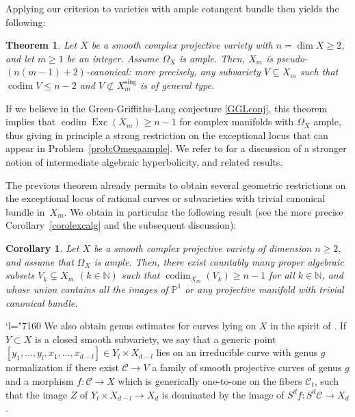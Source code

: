 \documentclass[JEP,XML,SOM,Unicode, NoEqCountersInSection,NoFloatCountersInSection,published]{cedram}
\let\mathcal\mathscr
\newcommand{\Changel}{\mathcode`l="7160}
\newcommand{\sing}{\mathrm{sing}}
\DeclareMathOperator{\codim}{codim}
\DeclareMathOperator{\Exc}{Exc}
\theoremstyle{theorem}
\newtheorem{theorem}{Theorem}
\newtheorem{corollary}[proposition]{Corollary}
\theoremstyle{definition}
\def\bP{{\mathbb P}}
\begin{document}
Applying our criterion to varieties with ample cotangent bundle then yields the following:

\begin{theorem} \label{thmsubv0}
Let $X$ be a smooth complex projective variety with $n=\dim X \geq 2$, and let \(m \geq 1\) be an integer. Assume $\Omega_X$ is ample. Then, \(X_{m}\) is pseudo-\((n(m-1) + 2)\)-canonical: more precisely, any subvariety $V \subseteq X_m$ such that $\codim  V \leq n - 2$ and $V \not\subset X_m^{\sing}$ is of general type.
\end{theorem}

If we believe in the Green-Griffiths-Lang conjecture \ref{GGLconj}, this theorem implies that $\codim\Exc(X_m) \geq n - 1$ for complex manifolds with $\Omega_X$ ample, thus giving in principle a strong restriction on the exceptional locus that can appear in Problem~\ref{prob:Omegaample}. We refer to \cite{EJR20} for a discussion of a stronger notion of intermediate algebraic hyperbolicity, and related results.

The previous theorem already permits to obtain several geometric restrictions on the exceptional locus of rational curves or subvarieties with trivial canonical bundle in~$X_m$. We obtain in particular the following result (see the more precise Corollary~\ref{corolexcalg} and the subsequent discussion):

\begin{corollary} \label{corolexcalgintro} Let \(X\) be a smooth complex projective variety of dimension \(n \geq 2\), and assume that $\Omega_X$ is ample. Then, there exist countably many proper algebraic subsets $V_k \subsetneq X_m$ $(k \in \mathbb N)$ such that $\codim_{X_m} (V_k) \geq n - 1$ for all $k \in \mathbb N$, and whose union contains all the images of \(\bP^{1}\) or any projective manifold with trivial canonical bundle.
\end{corollary}

\Changel
We also obtain genus estimates for curves lying on $X$ in the spirit of \cite[Cor.\,4]{AA02}. If $Y \subset X$ is a closed smooth subvariety, we say that a generic point \([y_{1}, \dotsc, y_{l}, x_{1}, \dotsc, x_{d-l}] \in Y_{l} \times X_{d-l}\) lies on an irreducible curve with genus $g$ normalization if there exist $\mathcal C \to V$ a family of smooth projective curves of genus $g$ and a morphism $f : \mathcal C \to X$ which is generically one-to-one on the fibers $\mathcal C_t$, such that the image $Z$ of $Y_l \times X_{d-l} \to X_d$ is dominated by the image of $S^d f :S^d \mathcal C \to X_d$.
\end{document}
